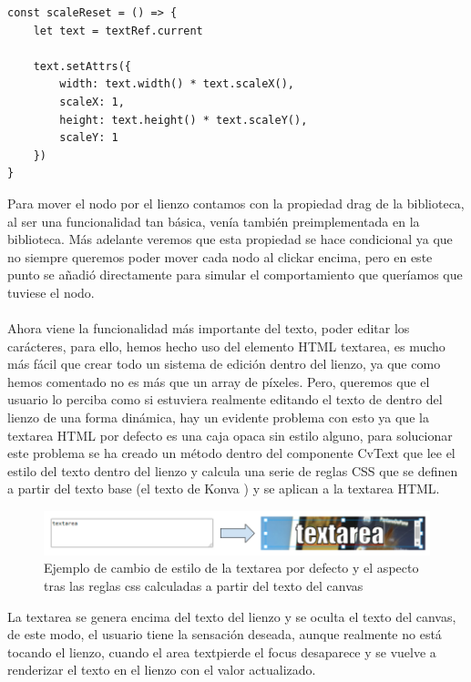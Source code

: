 \newpage

\begin{lstlisting}[caption={Sobrecarga del reescalado del nodo CvText}]
const scaleReset = () => {
    let text = textRef.current

    text.setAttrs({
        width: text.width() * text.scaleX(),
        scaleX: 1,
        height: text.height() * text.scaleY(),
        scaleY: 1
    })
}
\end{lstlisting}

Para mover el nodo por el lienzo contamos con la propiedad drag de la biblioteca, al ser
una funcionalidad tan básica, venía también preimplementada en la biblioteca.
Más adelante veremos que esta propiedad se hace condicional ya que no siempre queremos
poder mover cada nodo al clickar encima, pero en este punto se añadió directamente para
simular el comportamiento que queríamos que tuviese el nodo.
\\\\
Ahora viene la funcionalidad más importante del texto, poder editar los 
carácteres, para ello, hemos hecho uso del elemento HTML textarea, es mucho más
fácil que crear todo un sistema de edición dentro del lienzo, ya que como hemos comentado
no es más que un array de píxeles. Pero, queremos que el usuario lo perciba como si estuviera
realmente editando el texto de dentro del lienzo de una forma dinámica,
hay un evidente problema con esto ya que la textarea HTML por defecto es una caja opaca
sin estilo alguno, para solucionar este problema se ha creado un método dentro del 
componente CvText que lee el estilo del texto dentro del lienzo y calcula una serie
de reglas CSS que se definen a partir del texto base (el texto de Konva \cite{KonvaJS})
y se aplican a la textarea HTML.

\begin{figure}[!h]
  \centering
    \includegraphics[scale=0.55]{img/textareadiff.png}
  \caption{Ejemplo de cambio de estilo de la textarea por defecto y el aspecto tras las reglas css calculadas a partir del texto del canvas}
\end{figure}

La textarea se genera encima del texto del lienzo y se oculta el texto del canvas,
de este modo, el usuario tiene la sensación deseada, aunque realmente no está tocando
el lienzo, cuando el area textpierde el focus desaparece y se vuelve a renderizar el 
texto en el lienzo con el valor actualizado.

